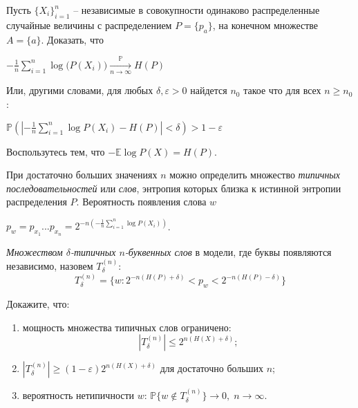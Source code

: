 \begin{problem}
Пусть $\{X_i\}_{i=1}^n$ -- независимые в совокупности одинаково распределенные случайные величины с распределением $P = \{p_{a}\}$, на конечном множестве $A = \{a\}$. Доказать, что 
\begin{center}
$-\frac{1}{n} \sum_{i = 1}^n \log \biggl ( P(X_i) \biggr ) \xrightarrow[n \to \infty]{\mathbb{P}} H(P)$
\end{center}
Или, другими словами, для любых $\delta, \varepsilon > 0$ найдется $n_0$ такое что для всех $n \geq n_0$:
\begin{center}
$\mathbb{P}(|-\frac{1}{n} \sum_{i = 1}^n \log P(X_i) - H(P)| < \delta) > 1-\varepsilon$
\end{center}

\begin{ordre}
Воспользутесь тем, что $-\mathbb{E} \log P(X) = H(P)$.
\end{ordre}
\end{problem}

\begin{remark} При достаточно больших значениях $n$ можно определить множество \textit{типичных последовательностей} или \textit{слов}, энтропия которых близка к истинной энтропии распределения $P$. Вероятность появления слова $w$
\begin{center}
$p_w = p_{x_1}...p_{x_n} = 2^{-n (-\frac{1}{n} \sum_{i = 1}^n \log P(X_i))}$.
\end{center}
\textit{Множеством $\delta$-типичных $n$-буквенных слов} в модели, где буквы появляются независимо, назовем $T_{\delta}^{(n)}$:
$$
T_{\delta}^{(n)} = \{w: 2^{-n(H(P) + \delta)} < p_w < 2^{-n(H(P) - \delta)} \}
$$
\end{remark}

\begin{problem}
Докажите, что:
\begin{enumerate}
\item мощность множества типичных слов ограничено: \[|T_{\delta}^{(n)}| \leq 2^{n(H(X) + \delta)};\]
\item $|T_{\delta}^{(n)}| \geq (1-\varepsilon)2^{n(H(X) + \delta)}$ для достаточно больших $n$;
\item вероятность нетипичности $w$: $\mathbb{P}\{w \not\in T_{\delta}^{(n)} \} \to 0, \; n\to\infty$.
\end{enumerate}
\end{problem}

